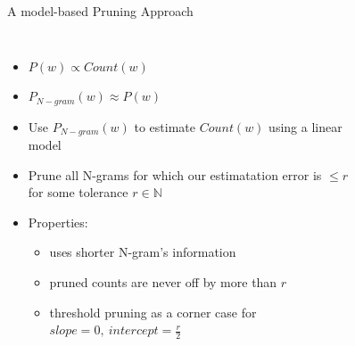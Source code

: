 \documentclass[16:9,en,navbarinfooter]{sdqbeamer}
\begin{document}
\begin{frame}{A model-based Pruning Approach}
    \begin{columns}
    \begin{itemize}
        \item $P(w) \propto Count(w)$
        \item $P_{N-gram}(w) \approx P(w)$
        \item Use $P_{N-gram}(w)$ to estimate $Count(w)$ using a linear model
        \item Prune all N-grams for which our estimatation error 
            is $\leq r$ for some tolerance $r\in\mathbb N$
        \item Properties:
        \begin{itemize}
            \item uses shorter N-gram's information
            \item pruned counts are never off by more than $r$
            \item threshold pruning as a corner case for $slope=0,\ intercept = \frac r2$
        \end{itemize}
\end{itemize}
\begin{figure}
    
\end{figure}
\end{columns}
\end{frame}
\end{document}
